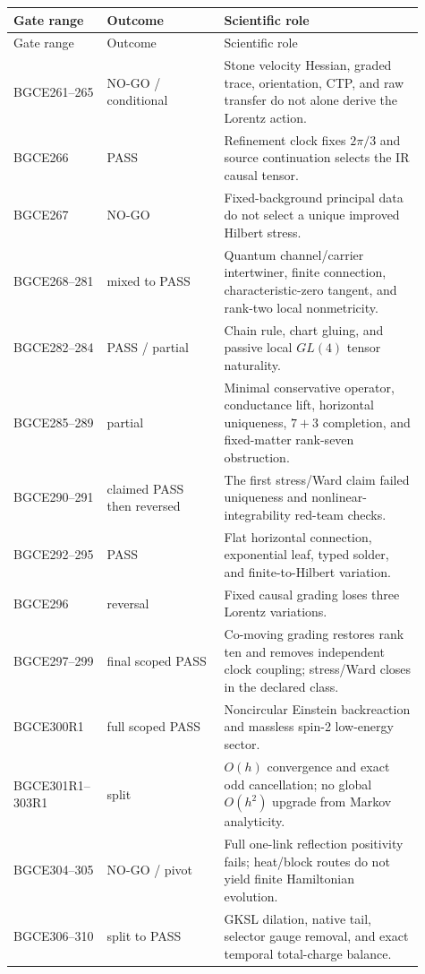 \documentclass[11pt]{article}
\theoremstyle{definition}
\theoremstyle{remark}
\begin{document}
\begin{longtable}{>{\raggedright\arraybackslash}p{0.18\linewidth} >{\raggedright\arraybackslash}p{0.27\linewidth} >{\raggedright\arraybackslash}p{0.46\linewidth}}
\toprule
Gate range & Outcome & Scientific role \\
\midrule
\endfirsthead
\toprule
Gate range & Outcome & Scientific role \\
\midrule
\endhead
BGCE261--265 & NO-GO / conditional & Stone velocity Hessian, graded trace, orientation, CTP, and raw transfer do not alone derive the Lorentz action. \\
BGCE266 & PASS & Refinement clock fixes $2\pi/3$ and source continuation selects the IR causal tensor. \\
BGCE267 & NO-GO & Fixed-background principal data do not select a unique improved Hilbert stress. \\
BGCE268--281 & mixed to PASS & Quantum channel/carrier intertwiner, finite connection, characteristic-zero tangent, and rank-two local nonmetricity. \\
BGCE282--284 & PASS / partial & Chain rule, chart gluing, and passive local $GL(4)$ tensor naturality. \\
BGCE285--289 & partial & Minimal conservative operator, conductance lift, horizontal uniqueness, $7+3$ completion, and fixed-matter rank-seven obstruction. \\
BGCE290--291 & claimed PASS then reversed & The first stress/Ward claim failed uniqueness and nonlinear-integrability red-team checks. \\
BGCE292--295 & PASS & Flat horizontal connection, exponential leaf, typed solder, and finite-to-Hilbert variation. \\
BGCE296 & reversal & Fixed causal grading loses three Lorentz variations. \\
BGCE297--299 & final scoped PASS & Co-moving grading restores rank ten and removes independent clock coupling; stress/Ward closes in the declared class. \\
BGCE300R1 & full scoped PASS & Noncircular Einstein backreaction and massless spin-2 low-energy sector. \\
BGCE301R1--303R1 & split & $O(h)$ convergence and exact odd cancellation; no global $O(h^2)$ upgrade from Markov analyticity. \\
BGCE304--305 & NO-GO / pivot & Full one-link reflection positivity fails; heat/block routes do not yield finite Hamiltonian evolution. \\
BGCE306--310 & split to PASS & GKSL dilation, native tail, selector gauge removal, and exact temporal total-charge balance. \\

\end{longtable}
\end{document}
